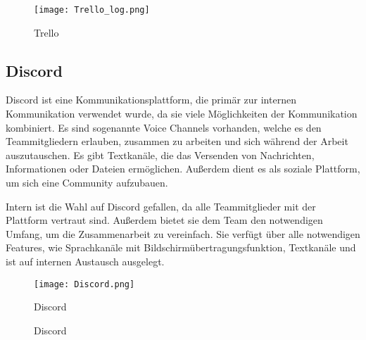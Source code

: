 \begin{figure}[H]
    \texttt{[image: Trello\_log.png]}
    \caption{Trello}
\end{figure}

\subsection{Discord}\label{subsec:Discord}
Discord ist eine Kommunikationsplattform, die primär zur internen Kommunikation verwendet wurde, da sie viele Möglichkeiten der Kommunikation kombiniert.
Es sind sogenannte Voice Channels vorhanden, welche es den Teammitgliedern erlauben, zusammen zu arbeiten und sich während der Arbeit auszutauschen.
Es gibt Textkanäle, die das Versenden von Nachrichten, Informationen oder Dateien ermöglichen.
Außerdem dient es als soziale Plattform, um sich eine Community aufzubauen.

Intern ist die Wahl auf Discord gefallen, da alle Teammitglieder mit der Plattform vertraut sind.
Außerdem bietet sie dem Team den notwendigen Umfang, um die Zusammenarbeit zu vereinfach.
Sie verfügt über alle notwendigen Features, wie Sprachkanäle mit Bildschirmübertragungsfunktion, Textkanäle und ist auf internen Austausch ausgelegt.

\begin{figure}[H]
    \texttt{[image: Discord.png]}\caption{Discord}
    \caption{Discord}
\end{figure}
%

\renewcommand{\kapitelautor}{}
